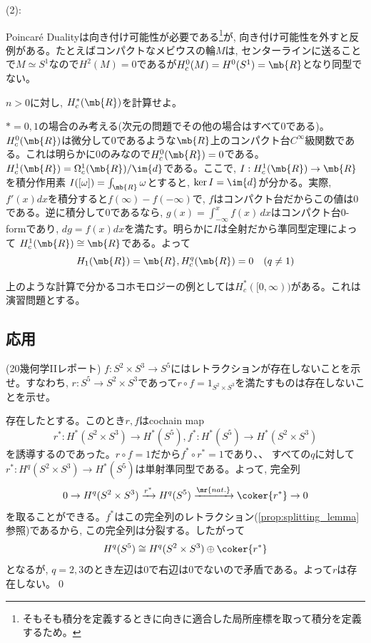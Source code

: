 (2):

\begin{eg}
\ben
\item Poincar\'{e} Dualityは向き付け可能性が必要である\footnote{そもそも積分を定義するときに向きに適合した局所座標を取って積分を定義するため。}が, 向き付け可能性を外すと反例がある。たとえばコンパクトなメビウスの輪$M$は, センターラインに送ることで$M\simeq S^1$なので$H^{2}(M) = 0$であるが$H_{c}^{0}(M) = H^{0}(S^1)=\mb{R}$となり同型でない。
\een
\end{eg}

\begin{egprob}
$n>0$に対し, $H_{c}^{\ast}(\mb{R})$を計算せよ。
\end{egprob}
\begin{egans}
$\ast=0,1$の場合のみ考える(次元の問題でその他の場合はすべて0である)。$H^{0}_{c}(\mb{R})$は微分して$0$であるような$\mb{R}$上のコンパクト台$C^{\infty}$級関数である。これは明らかに$0$のみなので$H_{c}^{0}(\mb{R}) = 0$である。$H_{c}^{1}(\mb{R}) = \Omega_{c}^{1}(\mb{R})/\im{d}$である。ここで, $I:H_{c}^{1}(\mb{R})\to \mb{R}$を積分作用素
$I([\omega]) = \int_{\mb{R}}\omega$とすると, $\ker{I} = \im{d}$が分かる。実際, $f'(x)dx$を積分すると$f(\infty) - f(-\infty)$で, 
$f$はコンパクト台だからこの値は0である。逆に積分して$0$であるなら,
$g(x) = \int_{-\infty}^{x}f(x)\, dx$はコンパクト台0-formであり, $dg=f(x)dx$を満たす。明らかに$I$は全射だから準同型定理によって
$H_{c}^{1}(\mb{R})\cong \mb{R}$である。よって
\[H_{1}(\mb{R})=\mb{R}, H_{c}^{q}(\mb{R}) = 0\quad (q\neq 1)\]
\end{egans}
上のような計算で分かるコホモロジーの例としては$H_{c}^{\ast}([0,\infty))$がある。これは演習問題とする。


\subsection{応用}


\begin{egprob} (20幾何学IIレポート) 
$f:S^2\times S^3\to S^5$にはレトラクションが存在しないことを示せ。すなわち, $r:S^5\to S^2\times S^3$であって$r\circ f = 1_{S^2\times S^3}$を満たすものは存在しないことを示せ。
\end{egprob}
\begin{egans}
存在したとする。このとき$r,f$はcochain map
\[r^{\ast}: H^{\ast}(S^2\times S^3) \to H^{\ast}(S^5), f^{\ast}:H^{\ast}(S^5)\to H^{\ast}(S^2\times S^3) \]
を誘導するのであった。$r\circ f = 1$だから$f^{\ast}\circ r^{\ast}=1$であり、、 すべての$q$に対して$r^{\ast}:H^{q}(S^2\times S^3)\to H^{\ast}(S^5)$は単射準同型である。よって, 完全列
\[0\to H^{q}(S^2\times S^3) \xrightarrow{r^{\ast}} H^{q}(S^5) \xrightarrow{\mr{nat.}} \coker{r^{\ast}} \to 0 \]
を取ることができる。$f^{\ast}$はこの完全列のレトラクション(\ref{prop:splitting_lemma}参照)であるから, この完全列は分裂する。したがって
\[H^{q}(S^5) \cong H^{q}(S^2\times S^3) \oplus \coker{r^{\ast}}\]
となるが, $q=2,3$のとき左辺は$0$で右辺は$0$でないので矛盾である。よって$r$は存在しない。\qed
\end{egans}

